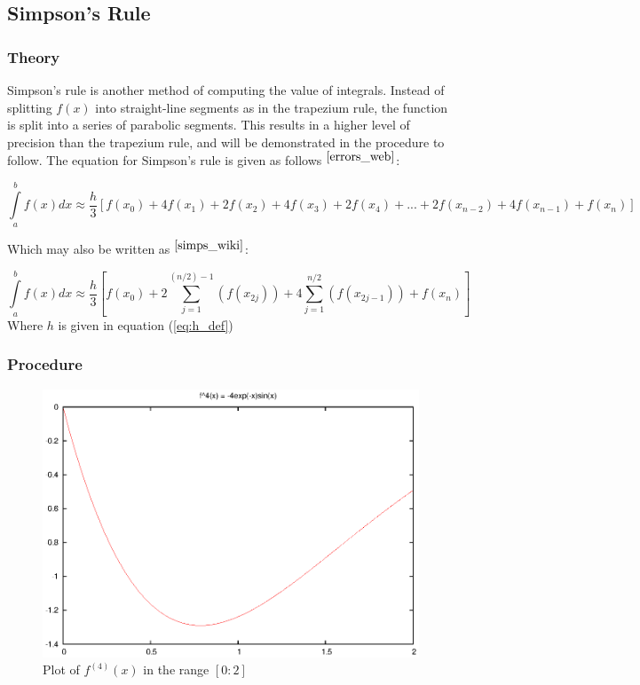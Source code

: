 \documentclass[pdf,color]{UoBnote}
\begin{document}
				
			
		\subsection{Simpson's Rule}
			\subsubsection{Theory}
				Simpson's rule is another method of computing the value of integrals. Instead of splitting $f(x)$ into straight-line segments as in the trapezium rule, the function is split into a
				series of parabolic segments. This results in a higher level of precision than the trapezium rule, and will be demonstrated in the procedure to follow. The equation for Simpson's rule is given as follows $^{\cite{errors_web}}$:
				
				\begin{equation} \label{simpsons}
					\int\limits_a^b f(x) dx \approx \frac{h}{3}\left[f(x_0) + 4f(x_1) + 2f(x_2) + 4f(x_3) + 2f(x_4) + ... + 2f(x_{n-2}) + 4f(x_{n-1}) +f(x_n)\right]
				\end{equation}
				
				Which may also be written as $^{\cite{simps_wiki}}$:
				
				
				\begin{equation} \label{simpsons_sum}
					\int\limits_a^b f(x) dx \approx \frac{h}{3}\left[f(x_0) + 2 \sum\limits_{j=1}^{(n/2)-1} \left(f(x_{2j})\right) + 4 \sum\limits_{j=1}^{n/2} \left(f(x_{2j-1})\right) + f(x_n) \right]
				\end{equation}
				Where $h$ is given in equation (\ref{eq:h_def})
				
			\subsubsection{Procedure}
				
				\begin{figure}[tb]
					\centering
						\includegraphics{figures/q2-f4x-simps.eps}
					\caption{Plot of $f^{\left(4\right)}(x)$ in the range $[0:2]$}
					\label{fig:q2-f4x-simps}
				\end{figure}
				
\end{document}
